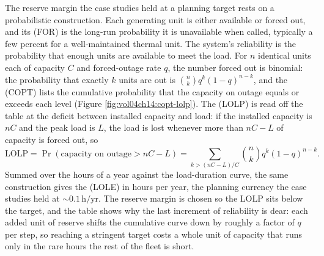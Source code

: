 The reserve margin the case studies held at a planning target rests on a
probabilistic construction. Each generating unit is either available or
forced out, and its  (FOR) is the long-run
probability it is unavailable when called, typically a few percent for a
well-maintained thermal unit. The system's reliability is the probability
that enough units are available to meet the load. For $n$ identical units each
of capacity $C$ and forced-outage rate $q$, the number forced out is binomial:
the probability that exactly $k$ units are out is $\binom{n}{k} q^k
(1-q)^{n-k}$, and the  (COPT) lists
the cumulative probability that the capacity on outage equals or exceeds each
level (Figure \ref{fig:vol04ch14:copt-lolp}). The
 (LOLP) is read off the table at the deficit
between installed capacity and load: if the installed capacity is $n C$ and the
peak load is $L$, the load is lost whenever more than $nC - L$ of capacity is
forced out, so
\[
\text{LOLP} = \Pr\!\left(\text{capacity on outage} > nC - L\right)
= \sum_{k > (nC-L)/C} \binom{n}{k} q^k (1-q)^{n-k}.
\]
Summed over the hours of a year against the load-duration curve, the same
construction gives the  (LOLE) in hours per
year, the planning currency the case studies held at $\sim 0.1\,\si{\hour}/
\text{yr}$. The reserve margin is chosen so the LOLP sits below the target,
and the table shows why the last increment of reliability is dear: each added
unit of reserve shifts the cumulative curve down by roughly a factor of $q$
per step, so reaching a stringent target costs a whole unit of capacity that
runs only in the rare hours the rest of the fleet is short.



